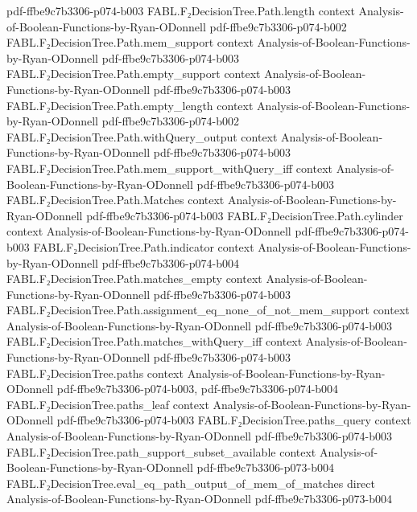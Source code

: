 \begin{theorem}
  {pdf-ffbe9c7b3306-p074-b003}
\proofstep
  {FABL.F₂DecisionTree.Path.length}
  {context}
  {Analysis-of-Boolean-Functions-by-Ryan-ODonnell}
  {pdf-ffbe9c7b3306-p074-b002}
\proofstep
  {FABL.F₂DecisionTree.Path.mem_support}
  {context}
  {Analysis-of-Boolean-Functions-by-Ryan-ODonnell}
  {pdf-ffbe9c7b3306-p074-b003}
\proofstep
  {FABL.F₂DecisionTree.Path.empty_support}
  {context}
  {Analysis-of-Boolean-Functions-by-Ryan-ODonnell}
  {pdf-ffbe9c7b3306-p074-b003}
\proofstep
  {FABL.F₂DecisionTree.Path.empty_length}
  {context}
  {Analysis-of-Boolean-Functions-by-Ryan-ODonnell}
  {pdf-ffbe9c7b3306-p074-b002}
\proofstep
  {FABL.F₂DecisionTree.Path.withQuery_output}
  {context}
  {Analysis-of-Boolean-Functions-by-Ryan-ODonnell}
  {pdf-ffbe9c7b3306-p074-b003}
\proofstep
  {FABL.F₂DecisionTree.Path.mem_support_withQuery_iff}
  {context}
  {Analysis-of-Boolean-Functions-by-Ryan-ODonnell}
  {pdf-ffbe9c7b3306-p074-b003}
\proofstep
  {FABL.F₂DecisionTree.Path.Matches}
  {context}
  {Analysis-of-Boolean-Functions-by-Ryan-ODonnell}
  {pdf-ffbe9c7b3306-p074-b003}
\proofstep
  {FABL.F₂DecisionTree.Path.cylinder}
  {context}
  {Analysis-of-Boolean-Functions-by-Ryan-ODonnell}
  {pdf-ffbe9c7b3306-p074-b003}
\proofstep
  {FABL.F₂DecisionTree.Path.indicator}
  {context}
  {Analysis-of-Boolean-Functions-by-Ryan-ODonnell}
  {pdf-ffbe9c7b3306-p074-b004}
\proofstep
  {FABL.F₂DecisionTree.Path.matches_empty}
  {context}
  {Analysis-of-Boolean-Functions-by-Ryan-ODonnell}
  {pdf-ffbe9c7b3306-p074-b003}
\proofstep
  {FABL.F₂DecisionTree.Path.assignment_eq_none_of_not_mem_support}
  {context}
  {Analysis-of-Boolean-Functions-by-Ryan-ODonnell}
  {pdf-ffbe9c7b3306-p074-b003}
\proofstep
  {FABL.F₂DecisionTree.Path.matches_withQuery_iff}
  {context}
  {Analysis-of-Boolean-Functions-by-Ryan-ODonnell}
  {pdf-ffbe9c7b3306-p074-b003}
\proofstep
  {FABL.F₂DecisionTree.paths}
  {context}
  {Analysis-of-Boolean-Functions-by-Ryan-ODonnell}
  {pdf-ffbe9c7b3306-p074-b003,
    pdf-ffbe9c7b3306-p074-b004}
\proofstep
  {FABL.F₂DecisionTree.paths_leaf}
  {context}
  {Analysis-of-Boolean-Functions-by-Ryan-ODonnell}
  {pdf-ffbe9c7b3306-p074-b003}
\proofstep
  {FABL.F₂DecisionTree.paths_query}
  {context}
  {Analysis-of-Boolean-Functions-by-Ryan-ODonnell}
  {pdf-ffbe9c7b3306-p074-b003}
\proofstep
  {FABL.F₂DecisionTree.path_support_subset_available}
  {context}
  {Analysis-of-Boolean-Functions-by-Ryan-ODonnell}
  {pdf-ffbe9c7b3306-p073-b004}
\proofstep
  {FABL.F₂DecisionTree.eval_eq_path_output_of_mem_of_matches}
  {direct}
  {Analysis-of-Boolean-Functions-by-Ryan-ODonnell}
  {pdf-ffbe9c7b3306-p073-b004}

\end{theorem}
